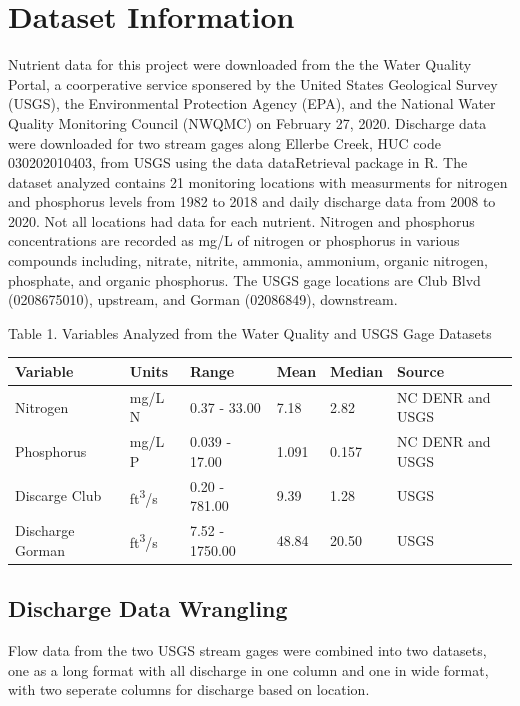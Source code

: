 \documentclass[12pt,]{article}
\begin{document}
\newpage

\hypertarget{dataset-information}{%
\section{Dataset Information}\label{dataset-information}}

Nutrient data for this project were downloaded from the the Water
Quality Portal, a coorperative service sponsered by the United States
Geological Survey (USGS), the Environmental Protection Agency (EPA), and
the National Water Quality Monitoring Council (NWQMC) on February 27,
2020. Discharge data were downloaded for two stream gages along Ellerbe
Creek, HUC code 030202010403, from USGS using the data dataRetrieval
package in R. The dataset analyzed contains 21 monitoring locations with
measurments for nitrogen and phosphorus levels from 1982 to 2018 and
daily discharge data from 2008 to 2020. Not all locations had data for
each nutrient. Nitrogen and phosphorus concentrations are recorded as
mg/L of nitrogen or phosphorus in various compounds including, nitrate,
nitrite, ammonia, ammonium, organic nitrogen, phosphate, and organic
phosphorus. The USGS gage locations are Club Blvd (0208675010),
upstream, and Gorman (02086849), downstream.

Table 1. Variables Analyzed from the Water Quality and USGS Gage
Datasets

\begin{longtable}[]{@{}llllll@{}}
\toprule
Variable & Units & Range & Mean & Median & Source\tabularnewline
\midrule
\endhead
Nitrogen & mg/L N & 0.37 - 33.00 & 7.18 & 2.82 & NC DENR and
USGS\tabularnewline
Phosphorus & mg/L P & 0.039 - 17.00 & 1.091 & 0.157 & NC DENR and
USGS\tabularnewline
Discarge Club & ft\textsuperscript{3}/s & 0.20 - 781.00 & 9.39 & 1.28 &
USGS\tabularnewline
Discharge Gorman & ft\textsuperscript{3}/s & 7.52 - 1750.00 & 48.84 &
20.50 & USGS\tabularnewline
\bottomrule
\end{longtable}

\hypertarget{discharge-data-wrangling}{%
\subsection{Discharge Data Wrangling}\label{discharge-data-wrangling}}

Flow data from the two USGS stream gages were combined into two
datasets, one as a long format with all discharge in one column and one
in wide format, with two seperate columns for discharge based on
location.
\end{document}
